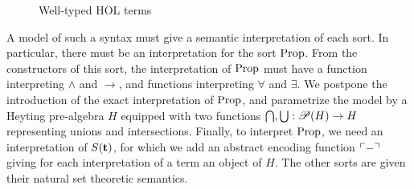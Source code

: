 \documentclass[a4paper,UKenglish,cleveref, autoref, thm-restate]{lipics-v2021}
\begin{document}
\begin{figure}[t]
\begin{mathpar}




  \end{mathpar}
   \label{fig:hol_terms}
   \caption{Well-typed HOL terms}   %
  \end{figure}

A model of such a syntax must give a semantic interpretation of each sort. In particular, there must be an interpretation for the sort $\mathrm{Prop}$. From the constructors of this sort, the interpretation of $\mathrm{Prop}$ must have a function interpreting $\land$ and $\to$, and functions interpreting $\forall$ and $\exists$. We postpone the introduction of the exact interpretation of $\mathrm{Prop}$, and parametrize the model by a Heyting pre-algebra $H$ equipped with two functions $\bigcap,\bigcup : \mathscr{P} (H) \to H$ representing unions and intersections. Finally, to interpret $\mathrm{Prop}$, we need an interpretation of $S(\mathbf{t})$, for which we add an abstract encoding function $\ulcorner-\urcorner$ giving for each interpretation of a term an object of $H$.
The other sorts are given their natural set theoretic semantics.
\end{document}
